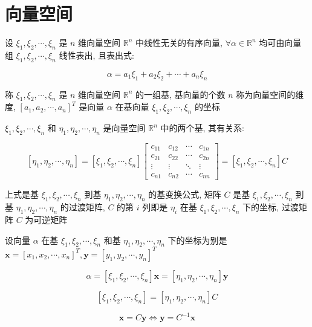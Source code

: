 \section{向量空间}
\begin{definition}[向量空间]
	设 $\xi_{1},\xi_{2},\cdots,\xi_{n}$ 是 $n$ 维向量空间 $\mathbb{R}^{n}$ 中线性无关的有序向量,
	$\forall \alpha\in \mathbb{R}^{n}$ 均可由向量组 $\xi_{1},\xi_{2},\cdots,\xi_{n}$ 线性表出, 且表出式:  
	
	$$\alpha=a_{1}\xi_{1}+a_{2}\xi_{2}+\cdots+a_{n}\xi_{n}$$
	
	称 $\xi_{1},\xi_{2},\cdots,\xi_{n}$ 是 $n$ 维向量空间 $\mathbb{R}^{n}$ 的一组基,
	基向量的个数 $n$ 称为向量空间的维度, $[a_{1},a_{2},\cdots,a_{n}]^{T}$ 是向量 $\alpha$ 在基向量 $\xi_{1},\xi_{2},\cdots,\xi_{n}$ 的坐标
\end{definition}

\begin{definition}[基变换]
	$\xi_{1},\xi_{2},\cdots,\xi_{n}$ 和 $\eta_{1},\eta_{2},\cdots,\eta_{n}$ 是向量空间 $\mathbb{R}^{n}$ 中的两个基, 其有关系:  
	
	$$[\eta_{1},\eta_{2},\cdots,\eta_{n}] = 
	[\xi_{1},\xi_{2},\cdots,\xi_{n}]
	\begin{bmatrix}
		c_{11} & c_{12} & \cdots & c_{1n}\\
		c_{21} & c_{22} & \cdots & c_{2n}\\
		\vdots & \vdots & \ddots & \vdots\\
		c_{n1} & c_{n2} & \cdots & c_{nn}
	\end{bmatrix} = [\xi_{1},\xi_{2},\cdots,\xi_{n}]C$$
	
	上式是基 $\xi_{1},\xi_{2},\cdots,\xi_{n}$ 到基 $\eta_{1},\eta_{2},\cdots,\eta_{n}$ 的基变换公式,
	矩阵 $C$ 是基 $\xi_{1},\xi_{2},\cdots,\xi_{n}$ 到基 $\eta_{1},\eta_{2},\cdots,\eta_{n}$ 的过渡矩阵,
	$C$ 的第 $i$ 列即是 $\eta_{i}$ 在基 $\xi_{1},\xi_{2},\cdots,\xi_{n}$ 下的坐标, 过渡矩阵 $C$ 为可逆矩阵
\end{definition}
\begin{definition}[坐标变换]
	设向量 $\alpha$ 在基 $\xi_{1},\xi_{2},\cdots,\xi_{n}$ 和基 $\eta_{1},\eta_{2},\cdots,\eta_{n}$ 下的坐标为别是 $\mathbf{x}=[x_{1},x_{2},\cdots,x_{n}]^{T},\mathbf{y}=[y_{1},y_{2},\cdots,y_{n}]^{T}$

	$$\alpha=[\xi_{1},\xi_{2},\cdots,\xi_{n}]\mathbf{x} = [\eta_{1},\eta_{2},\cdots,\eta_{n}]\mathbf{y}$$

	$$[\xi_{1},\xi_{2},\cdots,\xi_{n}] = [\eta_{1},\eta_{2},\cdots,\eta_{n}]C$$
	
	$$\mathbf{x} = C\mathbf{y} \Leftrightarrow \mathbf{y} = C^{-1}\mathbf{x}$$
\end{definition}



